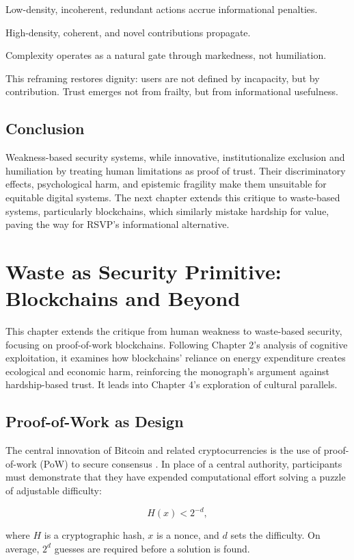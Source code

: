 \documentclass{book}
\begin{document}
Low-density, incoherent, redundant actions accrue informational penalties.

High-density, coherent, and novel contributions propagate.

Complexity operates as a natural gate through markedness, not humiliation.

This reframing restores dignity: users are not defined by incapacity, but by contribution. Trust emerges not from frailty, but from informational usefulness.

\section{Conclusion}

Weakness-based security systems, while innovative, institutionalize exclusion and humiliation by treating human limitations as proof of trust. Their discriminatory effects, psychological harm, and epistemic fragility make them unsuitable for equitable digital systems. The next chapter extends this critique to waste-based systems, particularly blockchains, which similarly mistake hardship for value, paving the way for RSVP’s informational alternative.

\chapter{Waste as Security Primitive: Blockchains and Beyond}

This chapter extends the critique from human weakness to waste-based security, focusing on proof-of-work blockchains. Following Chapter 2’s analysis of cognitive exploitation, it examines how blockchains’ reliance on energy expenditure creates ecological and economic harm, reinforcing the monograph’s argument against hardship-based trust. It leads into Chapter 4’s exploration of cultural parallels.

\section{Proof-of-Work as Design}

The central innovation of Bitcoin and related cryptocurrencies is the use of proof-of-work (PoW) to secure consensus \cite{nakamoto2008}. In place of a central authority, participants must demonstrate that they have expended computational effort solving a puzzle of adjustable difficulty:

\[ H(x) < 2^{-d}, \]

where \( H \) is a cryptographic hash, \( x \) is a nonce, and \( d \) sets the difficulty. On average, \( 2^d \) guesses are required before a solution is found.
\end{document}
